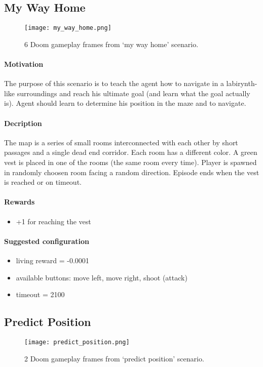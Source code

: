 	\subsection{My Way Home}
		\begin{figure}
			\centering
			\texttt{[image: my\_way\_home.png]}
			\caption{6 Doom gameplay frames from `my way home' scenario.}\label{fig:my_way_home}
		\end{figure}
		\paragraph{Motivation} 
			The purpose of this scenario is to teach the agent how to navigate in a labirynth-like surroundings and reach his ultimate goal (and learn what the goal actually is). Agent should learn to determine his position in the maze and to navigate.

		\paragraph{Decription}
			The map is a series of small rooms interconnected with each other by short passages and a single dead end corridor. Each room has a different color. A green vest is placed in one of the rooms (the same room every time). Player is spawned in randomly choosen room facing a random direction. Episode ends when the vest is reached or on timeout.
		\paragraph{Rewards}

		\begin{itemize}
			\item +1 for reaching the vest
		\end{itemize}
		
		\paragraph{Suggested configuration}
		\begin{itemize}
			\item living reward = -0.0001
			\item available buttons: move left, move right, shoot (attack)
			\item timeout = 2100
		\end{itemize}
	\newpage

	\subsection{Predict Position}
		\begin{figure}
			\centering
			\texttt{[image: predict\_position.png]}
			\caption{2 Doom gameplay frames from `predict position' scenario.}\label{fig:predict_position}
		\end{figure}
